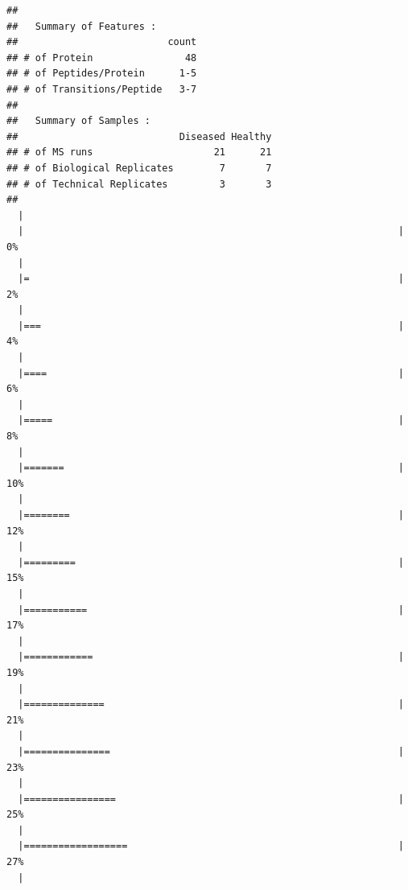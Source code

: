 \documentclass[]{book}
\begin{document}
\begin{verbatim}
##                        
##   Summary of Features :
##                          count
## # of Protein                48
## # of Peptides/Protein      1-5
## # of Transitions/Peptide   3-7
##                       
##   Summary of Samples :
##                            Diseased Healthy
## # of MS runs                     21      21
## # of Biological Replicates        7       7
## # of Technical Replicates         3       3
## 
  |                                                                       
  |                                                                 |   0%
  |                                                                       
  |=                                                                |   2%
  |                                                                       
  |===                                                              |   4%
  |                                                                       
  |====                                                             |   6%
  |                                                                       
  |=====                                                            |   8%
  |                                                                       
  |=======                                                          |  10%
  |                                                                       
  |========                                                         |  12%
  |                                                                       
  |=========                                                        |  15%
  |                                                                       
  |===========                                                      |  17%
  |                                                                       
  |============                                                     |  19%
  |                                                                       
  |==============                                                   |  21%
  |                                                                       
  |===============                                                  |  23%
  |                                                                       
  |================                                                 |  25%
  |                                                                       
  |==================                                               |  27%
  |                                                                       

\end{verbatim}
\end{document}
